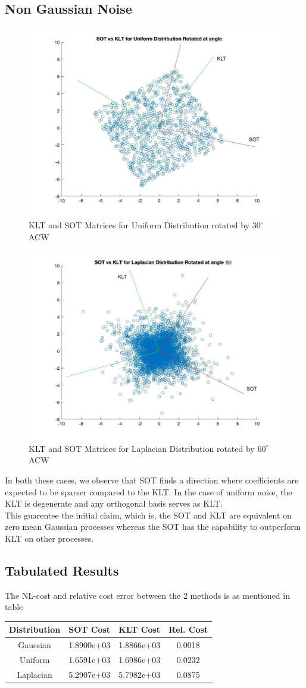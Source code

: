 \documentclass{article}
\theoremstyle{remark}
\begin{document}
\subsection*{Non Gaussian Noise}
\begin{figure}[H]
\centering\includegraphics[width=0.6\linewidth]{images/uniform.jpg}
\caption{KLT and SOT Matrices for Uniform Distribution rotated by $30^\circ$ ACW}
\end{figure}
\begin{figure}[H]
\centering\includegraphics[width=0.6\linewidth]{images/laplacian.jpg}
\caption{KLT and SOT Matrices for Laplacian Distribution rotated by $60^\circ$ ACW}
\end{figure}
In both these cases, we observe that SOT finds a direction where coefficients are expected to be sparser compared to the KLT. In the case of uniform noise, the KLT is degenerate and any orthogonal basis serves as KLT.\\[2mm]
This guarentee the initial claim, which is, the SOT and KLT are equivalent on zero mean Gaussian processes whereas the SOT has the capability to outperform KLT on other processes.
\subsection*{Tabulated Results}
The NL-cost and relative cost error between the 2 methods is as mentioned in table
\begin{table}[H]
\centering
\begin{tabular}{| c | c | c | c |}
\hline
\textbf{Distribution} & \textbf{SOT Cost} & \textbf{KLT Cost} & \textbf{Rel. Cost}\\
\hline
Gaussian & 1.8900e+03 & 1.8866e+03 & 0.0018\\
Uniform & 1.6591e+03 & 1.6986e+03 & 0.0232\\
Laplacian & 5.2907e+03 & 5.7982e+03 & 0.0875\\
\hline
\end{tabular}
\end{table}
\end{document}
